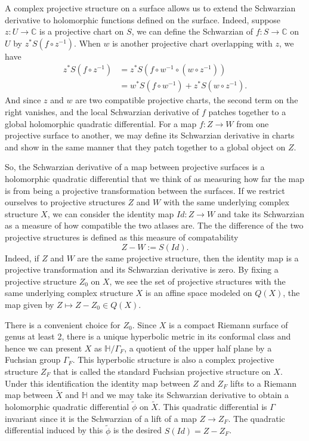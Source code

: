 \documentclass{amsart}
\newcommand{\C}{\mathbb{C}}
\renewcommand{\H}{\mathbb{H}}
\begin{document}
A complex projective structure on a surface allows us to extend the Schwarzian derivative to holomorphic functions defined on the surface.
Indeed, suppose $z: U \to \C$ is a projective chart on $S$, we can define the Schwarzian of $f:S \to \C$ on $U$ by $z^*S(f \circ z^{-1})$.
When $w$ is another projective chart overlapping with $z$, we have
\begin{align*}
z^*S(f \circ z^{-1})
&= z^* S(f \circ w^{-1} \circ (w \circ z^{-1})) \\
&= w^*S(f \circ w^{-1}) + z^*S(w \circ z^{-1}).
\end{align*}
And since $z$ and $w$ are two compatible projective charts, the second term on the right vanishes, and the local Schwarzian derivative of $f$ patches together to a global holomorphic quadratic differential.
For a map $f: Z \to W$ from one projective surface to another, we may define its Schwarzian derivative in charts and show in the same manner that they patch together to a global object on $Z$.

So, the Schwarzian derivative of a map between projective surfaces is a holomorphic quadratic differential that we think of as measuring how far the map is from being a projective transformation between the surfaces. 
If we restrict ourselves to projective structures $Z$ and $W$ with the same underlying complex structure $X$, we can consider the identity map $Id: Z \to W$ and take its Schwarzian as a measure of how compatible the two atlases are. 
The the difference of the two projective structures is defined as this measure of compatability
\[
Z - W := S(Id).
\]
Indeed, if $Z$ and $W$ are the same projective structure, then the identity map is a projective transformation and its Schwarzian derivative is zero.
By fixing a projective structure $Z_0$ on $X$, we see the set of projective structures with the same underlying complex structure $X$ is an affine space modeled on $Q(X)$, the map given by $Z \mapsto Z-Z_0 \in Q(X)$.

There is a convenient choice for $Z_0$. 
Since $X$ is a compact Riemann surface of genus at least 2, there is a unique hyperbolic metric in its conformal class and hence we can present $X$ as $\H/\Gamma_F$, a quotient of the upper half plane by a Fuchsian group $\Gamma_F$. 
This hyperbolic structure is also a complex projective structure $Z_F$ that is called the standard Fuchsian projective structure on $X$. 
Under this identification the identity map between $Z$ and $Z_F$ lifts to a Riemann map between $\tilde{X}$ and  $\H$ and we may take its Schwarzian derivative to obtain a holomorphic quadratic differential $\tilde{\phi}$ on $\tilde{X}$. 
This quadratic differential is $\Gamma$ invariant since it is the Schwarzian of a lift of a map $Z \to Z_F$. 
The quadratic differential induced by this $\tilde{\phi}$ is the desired $S(Id) = Z-Z_F$.
\end{document}
